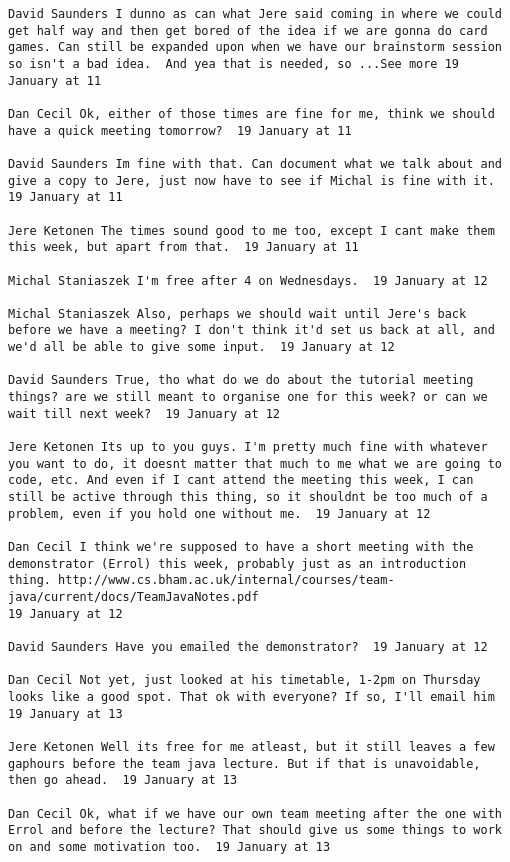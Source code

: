 \documentclass[10pt]{report}
\begin{document}
\begin{verbatim}
David Saunders I dunno as can what Jere said coming in where we could
get half way and then get bored of the idea if we are gonna do card
games. Can still be expanded upon when we have our brainstorm session
so isn't a bad idea.  And yea that is needed, so ...See more 19
January at 11

Dan Cecil Ok, either of those times are fine for me, think we should
have a quick meeting tomorrow?  19 January at 11

David Saunders Im fine with that. Can document what we talk about and
give a copy to Jere, just now have to see if Michal is fine with it.
19 January at 11

Jere Ketonen The times sound good to me too, except I cant make them
this week, but apart from that.  19 January at 11

Michal Staniaszek I'm free after 4 on Wednesdays.  19 January at 12

Michal Staniaszek Also, perhaps we should wait until Jere's back
before we have a meeting? I don't think it'd set us back at all, and
we'd all be able to give some input.  19 January at 12

David Saunders True, tho what do we do about the tutorial meeting
things? are we still meant to organise one for this week? or can we
wait till next week?  19 January at 12

Jere Ketonen Its up to you guys. I'm pretty much fine with whatever
you want to do, it doesnt matter that much to me what we are going to
code, etc. And even if I cant attend the meeting this week, I can
still be active through this thing, so it shouldnt be too much of a
problem, even if you hold one without me.  19 January at 12

Dan Cecil I think we're supposed to have a short meeting with the
demonstrator (Errol) this week, probably just as an introduction
thing. http://www.cs.bham.ac.uk/internal/courses/team-java/current/docs/TeamJavaNotes.pdf
19 January at 12

David Saunders Have you emailed the demonstrator?  19 January at 12

Dan Cecil Not yet, just looked at his timetable, 1-2pm on Thursday
looks like a good spot. That ok with everyone? If so, I'll email him
19 January at 13

Jere Ketonen Well its free for me atleast, but it still leaves a few
gaphours before the team java lecture. But if that is unavoidable,
then go ahead.  19 January at 13

Dan Cecil Ok, what if we have our own team meeting after the one with
Errol and before the lecture? That should give us some things to work
on and some motivation too.  19 January at 13


\end{verbatim}
\end{document}
